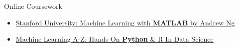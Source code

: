 \divider

{\large\color{emphasis}Online Coursework\par}
\smallskip
\begin{itemize}
\item \href{https://www.coursera.org/learn/machine-learning}{Stanford University: Machine Learning with \textbf{MATLAB} by Andrew Ng}
\item \href{https://www.udemy.com/machinelearning/learn/v4/overview}{Machine Learning A-Z: Hands-On \textbf{Python} \& R In Data Science}
\end{itemize}


